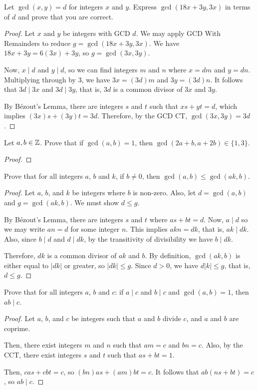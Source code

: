 \question Let $\gcd(x, y) = d$ for integers $x$ and $y$.
Express $\gcd(18x + 3y, 3x)$ in terms of $d$ and prove that you are correct.
\begin{proof}
  Let $x$ and $y$ be integers with GCD $d$.
  We may apply GCD With Remainders to reduce $g=\gcd(18x+3y,3x)$.
  We have $18x+3y = 6(3x) + 3y$, so $g=\gcd(3x,3y)$.

  Now, $x \mid d$ and $y \mid d$, so we can find integers $m$ and $n$ where $x = dm$ and $y = dn$.
  Multiplying through by 3, we have $3x = (3d)m$ and $3y = (3d)n$.
  It follows that $3d \mid 3x$ and $3d \mid 3y$, that is, $3d$ is a common divisor of $3x$ and $3y$.

  By Bézout's Lemma, there are integers $s$ and $t$ such that $xs+yt=d$, which implies $(3x)s+(3y)t=3d$.
  Therefore, by the GCD CT, $\gcd(3x,3y) = 3d$.
\end{proof}


\question Let $a,b\in\mathbb{Z}$. Prove that if $\gcd(a, b) = 1$, then $\gcd(2a+b, a+2b) \in \{1,3\}$.
\begin{proof}
\end{proof}


\question Prove that for all integers $a$, $b$ and $k$, if $b \neq 0$, then $\gcd(a, b) \leq \gcd(ak, b)$.
\begin{proof}
  Let $a$, $b$, and $k$ be integers where $b$ is non-zero.
  Also, let $d=\gcd(a,b)$ and $g=\gcd(ak,b)$. We must show $d \leq g$.

  By Bézout's Lemma, there are integers $s$ and $t$ where $as+bt=d$.
  Now, $a \mid d$ so we may write $an = d$ for some integer $n$.
  This implies $akn=dk$, that is, $ak \mid dk$.
  Also, since $b \mid d$ and $d \mid dk$, by the transitivity of divisibility we have $b \mid dk$.

  Therefore, $dk$ is a common divisor of $ak$ and $b$.
  By definition, $\gcd(ak,b)$ is either equal to $|dk|$ or greater, so $|dk| \leq g$.
  Since $d > 0$, we have $d|k| \leq g$, that is, $d \leq g$.
\end{proof}


\question Prove that for all integers $a$, $b$ and $c$:
if $a \mid c$ and $b \mid c$ and $\gcd(a, b) = 1$, then $ab \mid c$.
\begin{proof}
  Let $a$, $b$, and $c$ be integers such that $a$ and $b$ divide $c$, and $a$ and $b$ are coprime.

  Then, there exist integers $m$ and $n$ such that $am=c$ and $bn=c$.
  Also, by the CCT, there exist integers $s$ and $t$ such that $as+bt=1$.

  Then, $cas+cbt=c$, so $(bn)as+(am)bt=c$.
  It follows that $ab(ns+bt)=c$, so $ab \mid c$.
\end{proof}


